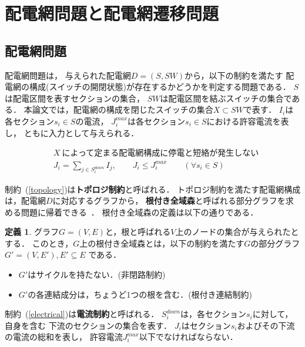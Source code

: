 \section{配電網問題と配電網遷移問題}\label{chap:problem}

\subsection{配電網問題}

配電網問題は，
与えられた配電網$D=(S,SW)$から，以下の制約を満たす
配電網の構成(スイッチの開閉状態)が存在するかどうかを判定する問題である．
$S$は配電区間を表すセクションの集合，
$SW$は配電区間を結ぶスイッチの集合である．
本論文では，配電網の構成を閉じたスイッチの集合$X\subset SW$で表す．
$I_{i}$は各セクション$s_{i}\in S$の電流，
$J_{i}^{max}$は各セクション$s_{i}\in S$における許容電流を表し，
ともに入力として与えられる．

\begin{eqnarray}
& X ~\textrm{によって定まる配電網構成に停電と短絡が発生しない}   \label{topology}\\
& J_i = \displaystyle\sum_{j\in S_i^{down}} I_j, \qquad J_i \leq J_{i}^{max}
  \qquad (\forall s_{i}\in S)\label{electrical}
\end{eqnarray}

制約~(\ref{topology})は\textbf{トポロジ制約}と呼ばれる．
トポロジ制約を満たす配電網構成は，配電網$D$に対応するグラフから，
\textbf{根付き全域森}と呼ばれる部分グラフを求める問題に帰着できる~\cite{Minato:dnet:netuki}．
根付き全域森の定義は以下の通りである．
\theoremstyle{definition}
\newtheorem*{definition*}{定義}
\begin{definition*}
  グラフ$G=(V,E)$と，根と呼ばれる$V$上のノードの集合が与えられたとする．
  このとき，$G$上の根付き全域森とは，以下の制約を満たす$G$の部分グラフ
  $G'=(V,E'), E' \subseteq E$ である．
  \begin{itemize}
  \item $G'$はサイクルを持たない．(非閉路制約)
  \item $G'$の各連結成分は，ちょうど1つの根を含む．(根付き連結制約)
  \end{itemize}
\end{definition*}

制約~(\ref{electrical})は\textbf{電流制約}と呼ばれる．
$S_{i}^{down}$は，各セクション$s_{i}$に対して，自身を含む
下流のセクションの集合を表す．
$J_{i}$はセクション$s_{i}$およびその下流の電流の総和を表し，
許容電流$J_{i}^{max}$以下でなければならない．

